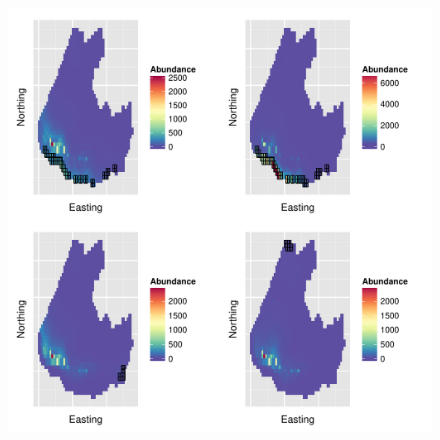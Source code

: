 \documentclass[12pt,english]{article}
\begin{document}
\begin{spacing}{1.9}
\begin{figure}[!h]
\begin{center}
\includegraphics[width=6in]{Bering_noRE_maps.pdf}
\end{center}
\caption{ }
\label{fig:covs}
\end{figure}



\clearpage

\end{spacing}
\end{document}
